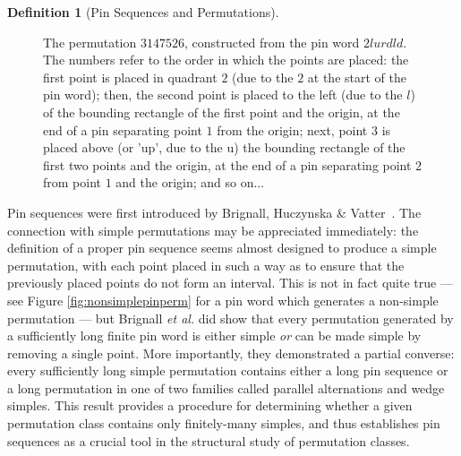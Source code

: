 \documentclass[11pt,a4paper]{article}
\theoremstyle{definition}
\newtheorem{defn}[thm]{Definition}
\begin{document}
\begin{defn}[Pin Sequences and Permutations]
\begin{figure}[h]
\begin{center}
\end{center}
\caption{The permutation $3147526$, constructed from the pin word $2lurdld$. The numbers refer to the order in which the points are placed: the first point is placed in quadrant $2$ (due to the $2$ at the start of the pin word); then, the second point is placed to the left (due to the $l$) of the bounding rectangle of the first point and the origin, at the end of a pin separating point $1$ from the origin; next, point $3$ is placed above (or 'up', due to the u) the bounding rectangle of the first two points and the origin, at the end of a pin separating point $2$ from point $1$ and the origin; and so on...}
\label{fig:example}
\end{figure}
\end{defn}

Pin sequences were first introduced by Brignall, Huczynska \& Vatter~\cite{brignall:decomposing-sim:}. The connection with simple permutations may be appreciated immediately: the definition of a proper pin sequence seems almost designed to produce a simple permutation, with each point placed in such a way as to ensure that the previously placed points do not form an interval. This is not in fact quite true --- see Figure \ref{fig:nonsimplepinperm} for a pin word which generates a non-simple permutation --- but Brignall \emph{et al.} did show that every permutation generated by a sufficiently long finite pin word is either simple \emph{or} can be made simple by removing a single point. More importantly, they demonstrated a partial converse: every sufficiently long simple permutation contains either a long pin sequence or a long permutation in one of two families called parallel alternations and wedge simples. This result provides a procedure for determining whether a given permutation class contains only finitely-many simples, and thus establishes pin sequences as a crucial tool in the structural study of permutation classes.
\end{document}
